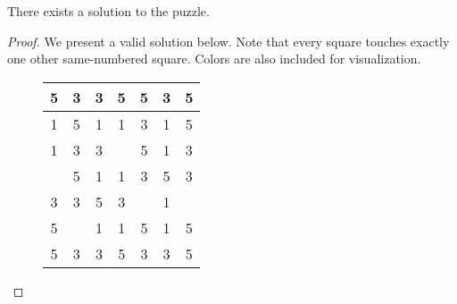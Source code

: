 \documentclass[10pt]{../usamts}
\begin{document}
\begin{solution}
\begin{claim}
    There exists a solution to the puzzle.
\end{claim}
\begin{proof}

\newcommand{\one}{\cellcolor{red!20}1}
\newcommand{\thr}{\cellcolor{blue!20}3}
\newcommand{\fiv}{\cellcolor{green!20}5}
\newcommand{\emp}{\cellcolor{gray}}

We present a valid solution below. Note that every square touches exactly one other same-numbered square. Colors are also included for visualization.

\begin{figure}[h!]
\Large \begin{tabular}{|c|c|c|c|c|c|c|}
    \hline
    \fiv & \thr & \thr & \fiv & \fiv & \thr & \fiv \\ \hline
    \one & \fiv & \one & \one & \thr & \one & \fiv \\ \hline
    \one & \thr & \thr & \emp & \fiv & \one & \thr \\ \hline
    \emp & \fiv & \one & \one & \thr & \fiv & \thr \\ \hline
    \thr & \thr & \fiv & \thr & \emp & \one & \emp  \\ \hline
    \fiv & \emp & \one & \one & \fiv & \one & \fiv \\ \hline
    \fiv & \thr & \thr & \fiv & \thr & \thr & \fiv \\ \hline
\end{tabular}
\end{figure}

\end{proof}
\end{solution}
\end{document}
